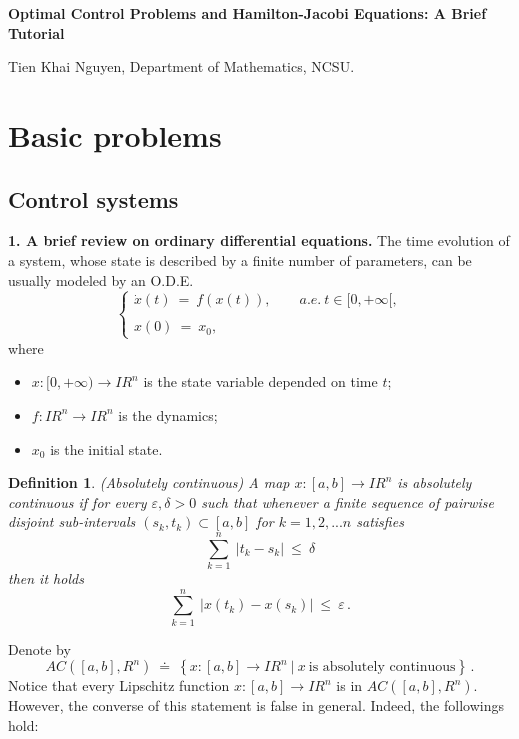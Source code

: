 \documentclass[letterpaper,12pt]{article}
\numberwithin{equation}{section}
\newcommand{\R}{\mathbb{R}}
\def\ve{\varepsilon}
\def\R{I\!\!R}
\newtheorem{definition}[theorem]{Definition}
\begin{document}
\begin{center}
\Large{\textbf{Optimal Control Problems and Hamilton-Jacobi Equations: A Brief Tutorial}}
\end{center}
\begin{center}
\large{Tien Khai Nguyen, Department of Mathematics, NCSU.}
\end{center}

\section{Basic problems} 
\subsection{Control systems}
{\bf 1. A brief review on ordinary differential equations.} The time evolution of a system, whose state is described by a  finite number of parameters,
can be usually modeled by an O.D.E.
\begin{equation}\label{ODE1}
 \left\{\begin{array}{ll}
\dot{x}(t)\: = \: f(x(t)),\qquad a.e.~ t\in[0,+\infty[,\\
\\
x(0)  \: = \:  x_0,
\end{array}\right.
\end{equation}
where 
\begin{itemize}
\item $x: [0,+\infty)\to\R^n$ is the state variable depended on time $t$;
\item $f:\R^n\to \R^n$ is the dynamics;
\item $x_0$ is the initial state.
\end{itemize}
\begin{definition} (Absolutely continuous) A map $x:[a,b]\to\R^n$ is absolutely continuous if for every $\ve,\delta>0$ such that whenever a finite sequence of pairwise disjoint sub-intervals $(s_k,t_k)\subset [a,b]$ for $k=1,2,...n$ satisfies
\[
\sum_{k=1}^n~|t_k-s_k|~\leq~\delta
\]
then it holds
\[
\sum_{k=1}^n~|x(t_k)-x(s_k)|~\leq~\ve\,.
\]
\end{definition}
Denote by 
\[
AC([a,b],R^n)~\doteq~\left\{x:[a,b]\to\R^n~|~x~\text{is absolutely continuous}\right\}\,.
\]
Notice that every Lipschitz function $x:[a,b]\to\R^n$ is in $AC([a,b],R^n)$. However, the converse of this statement is false in general. Indeed, the followings hold:
\end{document}
